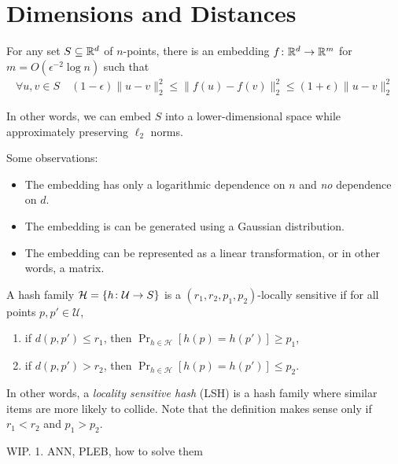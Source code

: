 \documentclass{article}
\begin{document}
\pagebreak

\section{Dimensions and Distances}

\begin{lemma}
For any set $S \subseteq \mathbb{R}^d$ of $n$-points, there is an embedding $f \colon \mathbb{R}^d \to \mathbb{R}^m$ for $m = O(\epsilon^{-2} \log n)$ such that
\begin{align}
  \forall u, v \in S \quad (1 - \epsilon) \|u - v\|_2^2 \le \|f(u) - f(v)\|_2^2 \le (1 + \epsilon) \|u - v\|_2^2
\end{align}
\end{lemma}
In other words, we can embed $S$ into a lower-dimensional space while approximately preserving $\ell_2$ norms.

Some observations:
\begin{itemize}
  \item The embedding has only a logarithmic dependence on $n$ and \emph{no} dependence on $d$.
  \item The embedding is can be generated using a Gaussian distribution.
  \item The embedding can be represented as a linear transformation, or in other words, a matrix.
\end{itemize}

\begin{definition}
  A hash family $\mathcal{H} = \{h \colon \mathcal{U} \to S\}$ is a $(r_1, r_2, p_1, p_2)$-locally sensitive if for all points $p, p' \in \mathcal{U}$,

  \begin{enumerate}
    \item if $d(p, p') \le r_1$, then $\Pr_{h \in \mathcal{H}}[h(p) = h(p')] \ge p_1$,
    \item if $d(p, p') > r_2$, then $\Pr_{h \in \mathcal{H}}[h(p) = h(p')] \le p_2$.
  \end{enumerate}

\end{definition}
In other words, a \emph{locality sensitive hash} (LSH) is a hash family where similar items are more likely to collide.
Note that the definition makes sense only if $r_1 < r_2$ and $p_1 > p_2$.

WIP.
1. ANN, PLEB, how to solve them
\end{document}

